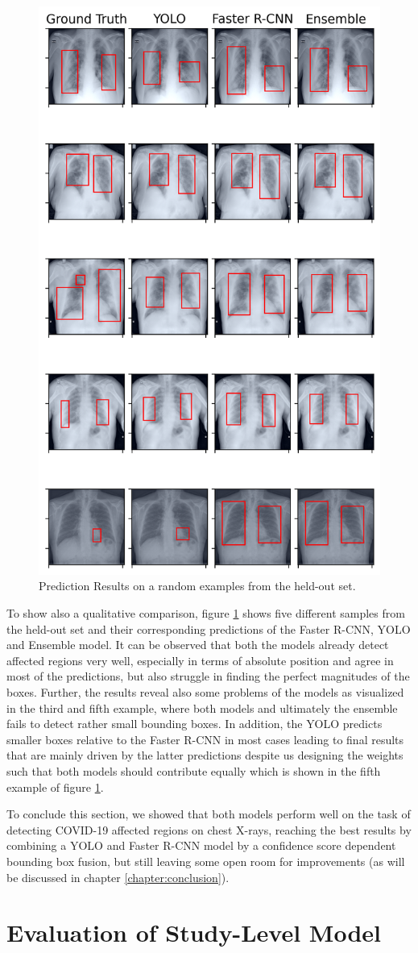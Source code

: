 \begin{figure}[h!]
	\centering
	\includegraphics[width=0.6\linewidth]{img/combo.png}
	\caption{Prediction Results on a random examples from the held-out set.}
	\label{fig:combo_eval}
\end{figure}

To show also a qualitative comparison, figure \ref{fig:combo_eval} shows five different samples from the held-out set and their corresponding predictions of the Faster \ac{R-CNN}, \ac{YOLO} and Ensemble model. It can be observed that both the models already detect affected regions very well, especially in terms of absolute position and agree in most of the predictions, but also struggle in finding the perfect magnitudes of the boxes. Further, the results reveal also some problems of the models as visualized in the third and fifth example, where both models and ultimately the ensemble fails to detect rather small bounding boxes. In addition, the \ac{YOLO} predicts smaller boxes relative to the Faster \ac{R-CNN} in most cases leading to final results that are mainly driven by the latter predictions despite us designing the weights such that both models should contribute equally which is shown in the fifth example of figure \ref{fig:combo_eval}. 

To conclude this section, we showed that both models perform well on the task of detecting COVID-19 affected regions on chest X-rays, reaching the best results by combining a \ac{YOLO} and Faster \ac{R-CNN} model by a confidence score dependent bounding box fusion, but still leaving some open room for improvements (as will be discussed in chapter \ref{chapter:conclusion}).

\section{Evaluation of Study-Level Model}
